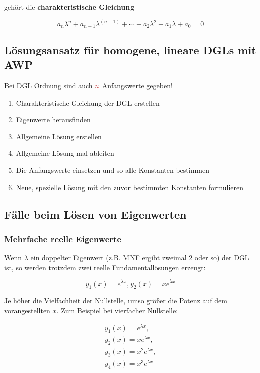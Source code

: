 \documentclass[12pt, a4paper]{scrreprt}
\begin{document}
gehört die \textbf{charakteristische Gleichung}

\[
  a_n\lambda^n+a_{n-1}\lambda^{(n-1)}+ \cdots + a_2\lambda^2+a_1\lambda+a_0=0
\]

\subsection{Lösungsansatz für homogene, lineare DGLs mit AWP}

Bei DGL  Ordnung sind auch \(\mytextred{n}\) Anfangswerte gegeben!

\begin{enumerate}
\item Charakteristische Gleichung der DGL erstellen
\item Eigenwerte herausfinden
\item Allgemeine Lösung erstellen
\item Allgemeine Lösung  mal ableiten
\item Die Anfangswerte einsetzen und so alle Konstanten bestimmen
\item Neue, spezielle Lösung mit den zuvor bestimmten Konstanten formulieren
\end{enumerate}

\subsection{Fälle beim Lösen von Eigenwerten}

\subsubsection{Mehrfache reelle Eigenwerte}

Wenn \(\lambda\) ein doppelter Eigenwert (z.B. MNF ergibt zweimal 2 oder so) der DGL ist, so werden trotzdem zwei reelle Fundamentallösungen erzeugt:

\[
  y_1(x)=e^{\lambda x}, y_2(x)=xe^{\lambda x}
\]

Je höher die Vielfachheit der Nullstelle, umso größer die Potenz auf dem vorangestellten \(x\). Zum Beispiel bei vierfacher Nullstelle:

\[
  \begin{split}
    y_1(x)=e^{\lambda x},\\
    y_2(x)=xe^{\lambda x},\\
    y_3(x)=x^2e^{\lambda x},\\
    y_4(x)=x^3e^{\lambda x}
  \end{split}
\]
\end{document}
